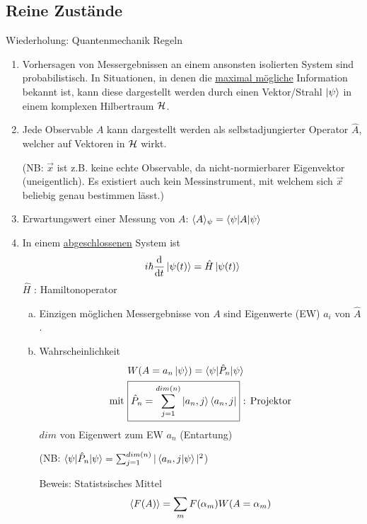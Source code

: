 \subsection{Reine Zustände} 
Wiederholung: Quantenmechanik Regeln
	\begin{enumerate}[1.]
		\item Vorhersagen von Messergebnissen an einem ansonsten isolierten System sind probabilistisch. In Situationen, in denen die \underline{maximal mögliche} Information bekannt ist, kann diese dargestellt werden durch einen Vektor/Strahl $\ket{\psi}$ in einem komplexen Hilbertraum $\mathcal{H}$.
		\item Jede Observable $A$ kann dargestellt werden als selbstadjungierter Operator $\hat{A}$, welcher auf Vektoren in $\mathcal{H}$ wirkt.
		
		(NB: $\vec{x}$ ist z.B. keine echte Observable, da nicht-normierbarer Eigenvektor (uneigentlich). Es existiert auch kein Messinstrument, mit welchem sich $\vec{x}$ beliebig genau bestimmen lässt.)
		\item Erwartungswert einer Messung von $A$: $\langle {A} \rangle_\psi = \braket{\psi | A | \psi}$
		\label{Regel3}
		\item In einem \underline{abgeschlossenen} System ist
			\begin{align*}
				i \hbar \frac{\mathrm{d}}{\mathrm{d} t} \ket{\psi (t)} = \hat{H} \ket{\psi(t)}
			\end{align*}
		$\hat{H}$ : Hamiltonoperator
		\begin{enumerate}[(a)]
			\item Einzigen möglichen Messergebnisse von $A$ sind Eigenwerte (EW) $a_i$ von $\hat{A}$.
			\item Wahrscheinlichkeit
				\begin{align*}
					&W(A = a_n \ket{\psi}) = \braket{\psi | \hat{P}_n | \psi} \\
					\text{mit}~
					&\boxed{\hat{P}_n = \sum_{j = 1}^{dim (n)} \ket{a_n, j} \bra{a_n, j}}
					~\text{: Projektor}
				\end{align*}
			$dim$ von Eigenwert zum EW $a_n$ (Entartung)
			
			(NB: $\braket{\psi | \hat{P}_n | \psi} = \sum_{j= 1}^{dim(n)}|\braket{a_n, j | \psi}|^2$)
			
			Beweis: Statistsisches Mittel
				\begin{align*}
					\langle {F(A)} \rangle = \sum_m F(\alpha_m) W(A = \alpha_m)
				\end{align*}
				

\end{enumerate}
\end{enumerate}
